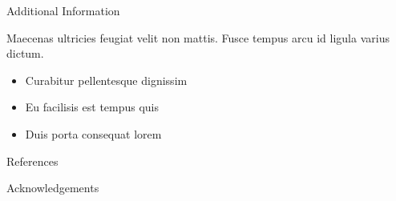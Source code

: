 \documentclass[final]{beamer}
\newlength{\onecolwid}
\begin{document}
\begin{frame}[t]
\begin{columns}[t]
\begin{column}{\onecolwid}
\begin{block}{Additional Information}

Maecenas ultricies feugiat velit non mattis. Fusce tempus arcu id ligula varius dictum. 
\begin{itemize}
\item Curabitur pellentesque dignissim
\item Eu facilisis est tempus quis
\item Duis porta consequat lorem
\end{itemize}

\end{block}


\begin{block}{References}

\nocite{*} %
\small{
\vspace{0.75in}}

\end{block}



\begin{block}{Acknowledgements}

\small{} \\

\end{block}




\end{column}
\end{columns}
\end{frame}
\end{document}
